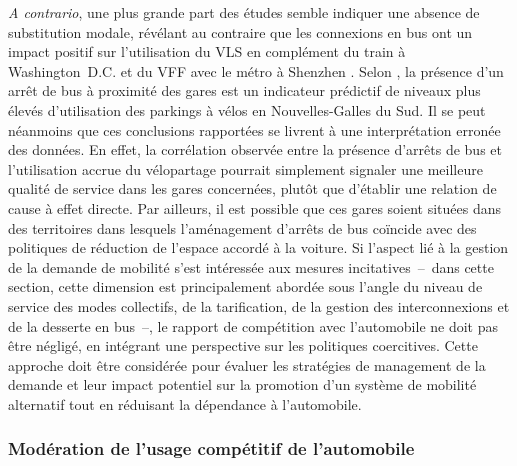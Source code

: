 \begin{refsegment}
\textsl{A contrario}, une plus grande part des études semble indiquer une absence de substitution modale, révélant au contraire que les connexions en bus ont un impact positif sur l'utilisation du \acrshort{VLS} en complément du train à Washington~D.C. \textcolor{blue}{\autocite[7-8]{ma_bicycle_2015}} et du \acrshort{VFF} avec le métro à Shenzhen \textcolor{blue}{\autocite[12]{guo_built_2020}}. Selon \textcolor{blue}{\textcite[20]{arbis_analysis_2016}}, la présence d'un arrêt de bus à proximité des gares est un indicateur prédictif de niveaux plus élevés d'utilisation des parkings à vélos en Nouvelles-Galles du Sud. Il se peut néanmoins que ces conclusions rapportées se livrent à une interprétation erronée des données. En effet, la corrélation observée entre la présence d'arrêts de bus et l'utilisation accrue du vélopartage pourrait simplement signaler une meilleure qualité de service dans les gares concernées, plutôt que d'établir une relation de cause à effet directe. Par ailleurs, il est possible que ces gares soient situées dans des territoires dans lesquels l'aménagement d'arrêts de bus coïncide avec des politiques de réduction de l'espace accordé à la voiture. Si l'aspect lié à la gestion de la demande de mobilité s'est intéressée aux mesures incitatives~–~dans cette section, cette dimension est principalement abordée sous l'angle du niveau de service des modes collectifs, de la tarification, de la gestion des interconnexions et de la desserte en bus~–, le rapport de compétition avec l'automobile ne doit pas être négligé, en intégrant une perspective sur les politiques coercitives. Cette approche doit être considérée pour évaluer les stratégies de management de la demande et leur impact potentiel sur la promotion d'un système de mobilité alternatif tout en réduisant la dépendance à l'automobile.%

\subsubsection*{Modération de l'usage compétitif de l'automobile
    \label{chap2:moderation-automobile}
    }
    

\end{refsegment}
